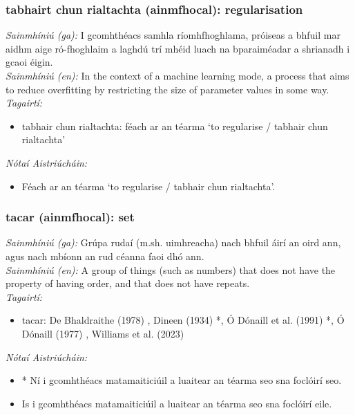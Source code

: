 \subsubsection*{tabhairt chun rialtachta (ainmfhocal): regularisation}
 \noindent \textit{Sainmhíniú (ga):} I gcomhthéacs samhla ríomhfhoghlama, próiseas a bhfuil mar aidhm aige ró-fhoghlaim a laghdú trí mhéid luach na bparaiméadar a shrianadh i gcaoi éigin.
\\
 \noindent \textit{Sainmhíniú (en):} In the context of a machine learning mode, a process that aims to reduce overfitting by restricting the size of parameter values in some way.
\\
 \noindent \textit{Tagairtí:}
\begin{itemize}
	\item tabhair chun rialtachta: féach ar an téarma `to regularise / tabhair chun rialtachta'
\end{itemize}

 \noindent \textit{Nótaí Aistriúcháin:}
\begin{itemize}
	\item Féach ar an téarma `to regularise / tabhair chun rialtachta'.
\end{itemize}


\subsubsection*{tacar (ainmfhocal): set}
 \noindent \textit{Sainmhíniú (ga):} Grúpa rudaí (m.sh. uimhreacha) nach bhfuil áirí an oird ann, agus nach mbíonn an rud céanna faoi dhó ann.
\\
 \noindent \textit{Sainmhíniú (en):} A group of things (such as numbers) that does not have the property of having order, and that does not have repeats.
\\
 \noindent \textit{Tagairtí:}
\begin{itemize}
	\item tacar: De Bhaldraithe (1978) \cite{de-bhaldraithe}, Dineen (1934) \cite{dineen}*, Ó Dónaill et al. (1991) \cite{focloir-beag}*, Ó Dónaill (1977) \cite{odonaill}, Williams et al. (2023) \cite{storchiste}
\end{itemize}

 \noindent \textit{Nótaí Aistriúcháin:}
\begin{itemize}
	\item * Ní i gcomhthéacs matamaiticiúil a luaitear an téarma seo sna foclóirí seo.
	\item Is i gcomhthéacs matamaiticiúil a luaitear an téarma seo sna foclóirí eile.
\end{itemize}


